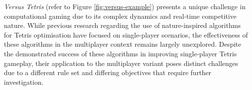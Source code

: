 \documentclass[a4paper, 12pt]{extreport}
\begin{document}
	
	
	\textit{Versus Tetris} (refer to Figure \ref{fig:versus-example}) presents a unique challenge in computational gaming due to its complex dynamics and real-time competitive nature. While previous research regarding the use of nature-inspired algorithms for Tetris optimisation have focused on single-player scenarios, the effectiveness of these algorithms in the multiplayer context remains largely unexplored. Despite the demonstrated success of these algorithms in improving single-player Tetris gameplay, their application to the multiplayer variant poses distinct challenges due to a different rule set and differing objectives that require further investigation.
	
\end{document}
